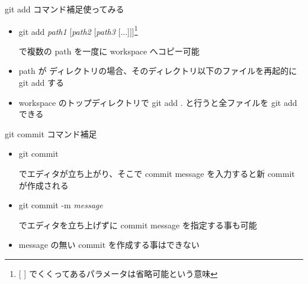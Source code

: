 \begin{frame}[t]{git add コマンド補足}{使ってみる}

  \begin{itemize}
  \item git add \textit{path1} [\textit{path2} [\textit{path3} [...]]]\footnote{[ ] でくくってあるパラメータは省略可能という意味}

    で複数の path を一度に workspace へコピー可能
    \vspace{2ex}

  \item path が ディレクトリの場合、そのディレクトリ以下のファイルを再起的に git add する
    \vspace{2ex}

  \item workspace のトップディレクトリで git add . と行うと全ファイルを git add できる
  \end{itemize}

\end{frame}


\begin{frame}[t]{git commit コマンド補足}{}

  \begin{itemize}
  \item git commit

    でエディタが立ち上がり、そこで commit message を入力すると新 commit が作成される
    \vspace{2ex}

  \item git commit -m \textit{message}

    でエディタを立ち上げずに commit message を指定する事も可能
    \vspace{2ex}

  \item message の無い commit を作成する事はできない
  \end{itemize}

\end{frame}
